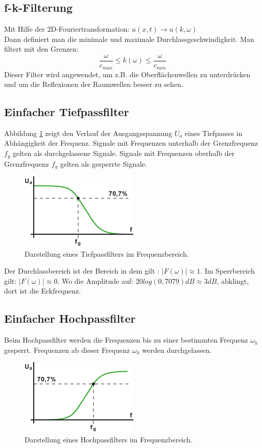\subsection*{f-k-Filterung}
Mit Hilfe der 2D-Fouriertransformation: $u(x,t)\longrightarrow u(k,\omega)$\\
Dann definiert man die minimale und maximale Durchlassgeschwindigkeit. Man filtert mit den Grenzen: \\
\begin{equation*}
\dfrac{\omega}{c_{max}}\leq k(\omega)\leq \frac{\omega}{c_{min}}
\end{equation*}
Dieser Filter wird angewendet, um z.B. die Oberflächenwellen zu unterdrücken und um die Reflexionen der Raumwellen besser zu sehen.

\subsection*{Einfacher Tiefpassfilter}
Abbildung \ref{fig:filt_tiefpass} zeigt den Verlauf der Ausgangsspannung $U_a$ eines Tiefpasses in Abhängigkeit der Frequenz. Signale mit Frequenzen unterhalb der Grenzfrequenz $f_g$ gelten als durchgelassene Signale. Signale mit Frequenzen oberhalb der Grenzfrequenz $f_g$ gelten als gesperrte Signale.\\
\begin{figure}[h!]
\centering
\includegraphics[width=.4\tw]{fig/08-Filter/tiefpass.png}
\caption{Darstellung eines Tiefpassfilters im Frequenzbereich.}
\label{fig:filt_tiefpass}
\end{figure}
Der Durchlassbereich ist der Bereich in dem gilt : $\vert F(\omega) \vert \approx 1 $.
Im Sperrbereich gilt: $\vert F(\omega) \vert \approx 0 $. Wo die Amplitude auf: 
$20log(0,7079)dB \approx 3dB$,  abklingt, dort ist die Eckfrequenz.

\subsection{Einfacher Hochpassfilter}
Beim Hochpassfilter werden die Frequenzen bis zu einer bestimmten Frequenz $\omega_{h}$  gesperrt. Frequenzen ab dieser Frequenz $\omega_{h}$ werden durchgelassen.
\begin{figure}[h!]
\centering
\includegraphics[width=.4\tw]{fig/08-Filter/hochpass.png}
\caption{Darstellung eines Hochpassfilters im Frequenzbereich.}
\end{figure}

